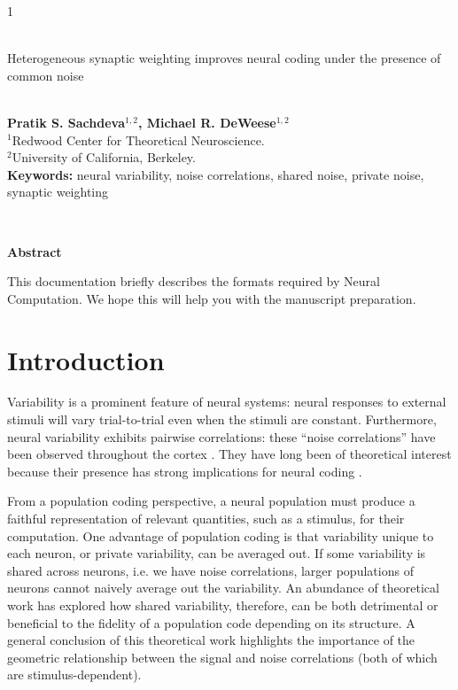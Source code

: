 \documentclass[12pt]{article}
\begin{document}
\hspace{13.9cm}1

\ \vspace{20mm}\\

{\LARGE Heterogeneous synaptic weighting improves neural coding under the presence of common noise}

\ \\
{\bf \large Pratik S. Sachdeva$^{\displaystyle 1, \displaystyle 2}$, Michael R. DeWeese$^{\displaystyle 1, \displaystyle 2}$}\\
{$^{\displaystyle 1}$Redwood Center for Theoretical Neuroscience.}\\
{$^{\displaystyle 2}$University of California, Berkeley.}\\
%

{\bf Keywords:} neural variability, noise correlations, shared noise, private noise, synaptic weighting

\thispagestyle{empty}
%
\ \vspace{-0mm}\\
%
\begin{center} {\bf Abstract} \end{center}
This documentation briefly describes the formats required by Neural Computation. We hope this will help you with the manuscript preparation.

\section{Introduction}
Variability is a prominent feature of neural systems: neural responses to external stimuli will vary trial-to-trial even when the stimuli are constant. Furthermore, neural variability exhibits pairwise correlations: these ``noise correlations'' have been observed throughout the cortex \citep{averbeck2006b, cohen2011}. They have long been of theoretical interest because their presence has strong implications for neural coding \citep{zohary1994, abbott1999}.

From a population coding perspective, a neural population must produce a faithful representation of relevant quantities, such as a stimulus, for their computation. One advantage of population coding is that variability unique to each neuron, or private variability, can be averaged out. If some variability is shared across neurons, i.e. we have noise correlations, larger populations of neurons cannot naively average out the variability. An abundance of theoretical work has explored how shared variability, therefore, can be both detrimental or beneficial to the fidelity of a population code depending on its structure. A  general conclusion of this theoretical work highlights the importance of the geometric relationship between the signal and noise correlations (both of which are stimulus-dependent).
\end{document}
